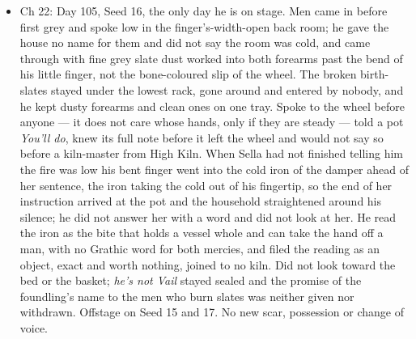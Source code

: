 \documentclass{design/chronicle}
\begin{document}
{\begin{itemize}[leftmargin=1.4em,itemsep=1pt,topsep=3pt,parsep=0pt]
\end{itemize}

\begin{itemize}[leftmargin=1.4em,itemsep=1pt,topsep=3pt,parsep=0pt]

\item Ch 22: Day 105, Seed 16, the only day he is on stage. Men came in before first grey and spoke low in the finger’s-width-open back room; he gave the house no name for them and did not say the room was cold, and came through with fine grey slate dust worked into both forearms past the bend of his little finger, not the bone-coloured slip of the wheel. The broken birth-slates stayed under the lowest rack, gone around and entered by nobody, and he kept dusty forearms and clean ones on one tray. Spoke to the wheel before anyone --- it does not care whose hands, only if they are steady --- told a pot \emph{You’ll do}, knew its full note before it left the wheel and would not say so before a kiln-master from High Kiln. When Sella had not finished telling him the fire was low his bent finger went into the cold iron of the damper ahead of her sentence, the iron taking the cold out of his fingertip, so the end of her instruction arrived at the pot and the household straightened around his silence; he did not answer her with a word and did not look at her. He read the iron as the bite that holds a vessel whole and can take the hand off a man, with no Grathic word for both mercies, and filed the reading as an object, exact and worth nothing, joined to no kiln. Did not look toward the bed or the basket; \emph{he’s not Vail} stayed sealed and the promise of the foundling’s name to the men who burn slates was neither given nor withdrawn. Offstage on Seed 15 and 17. No new scar, possession or change of voice.

\end{itemize}

\begin{itemize}[leftmargin=1.4em,itemsep=1pt,topsep=3pt,parsep=0pt]


\end{itemize}}
\end{document}
